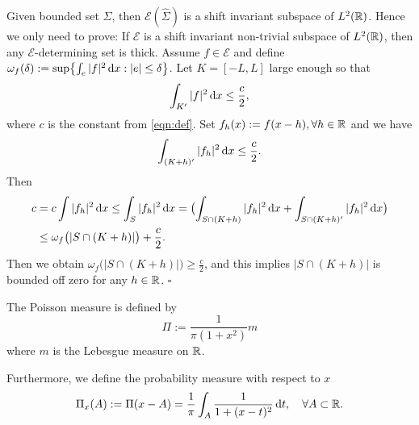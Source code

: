  Given bounded set $\Sigma$, then $\mathscr{E}(\widehat{\Sigma})$ is a shift invariant subspace of $L^2(\mathbb{R})$. Hence we only need to prove: If $\mathscr{E}$ is a shift invariant non-trivial subspace of $L^2(\mathbb{R})$, then any $\mathscr{E}$-determining set is thick. Assume $f\in \mathscr{E}$ and define $\omega_f(\delta):=\sup \bigl\{ \int_e|f|^2\,\mathrm{d} x: |e|\le \delta \bigr\}$. Let $K=[-L,L]$ large enough so that 
$$\int_{K'}|f|^2\,\mathrm{d} x\le \frac{c}{2},$$ where $c$ is the constant from \cref{eqn:def}. Set $f_h(x):=f(x-h),\forall h\in \mathbb{R}$ and we have
\[
	\int_{(K+h)'}|f_h|^2\,\mathrm{d} x \le \frac{c}{2}.
\]
Then 
\begin{align*}
	c&= c\int |f_h|^2\,\mathrm{d} x\le \int_S|f_h|^2\,\mathrm{d} x=\bigl(\int_{S\cap (K+h)}|f_h|^2\,\mathrm{d} x+\int_{S\cap (K+h)'}|f_h|^2\,\mathrm{d} x\bigr)\\
	 &\le \omega_f\bigl(|S\cap(K+h)|\bigr)+\frac{c}{2}
.\end{align*}
Then we obtain $\omega_f\bigl(|S\cap(K+h)|\bigr)\ge \frac{c}{2}$, and this implies $|S\cap (K+h)|$ is bounded off zero for any  $h\in \mathbb{R}$. \hfill $\square$
\begin{definition}
	The Poisson measure is defined by
	\[
	\Pi:=\frac{1}{\pi (1+x^{2})}m
	\] 
	where $m$ is the Lebesgue measure on $\mathbb{R}$.

	Furthermore, we define the probability measure with respect to $x$ 
	\[
	\Pi_x(A) :=\Pi(x-A)=\frac{1}{\pi}\int_A \frac{1}{1+(x-t)^2}\,\mathrm{d} t,\quad \forall A\subset \mathbb{R}.
	\] 
\end{definition} 

